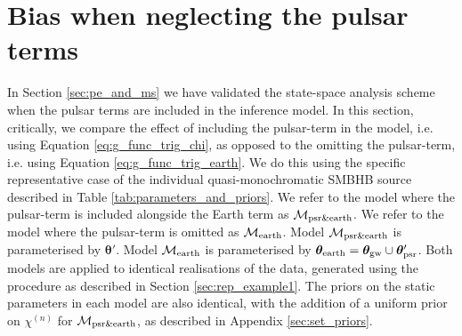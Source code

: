 \documentclass[fleqn,usenatbib,useAMS]{mnras}
\begin{document}
	
	







%







%

\section{Bias when neglecting the pulsar terms}\label{sec:earth_vs_psr}
In Section \ref{sec:pe_and_ms} we have validated the state-space analysis scheme when the pulsar terms are included in the inference model. In this section, critically, we compare the effect of including the pulsar-term in the model, i.e. using Equation \eqref{eq:g_func_trig_chi}, as opposed to the omitting the pulsar-term, i.e. using Equation \eqref{eq:g_func_trig_earth}. We do this using the specific representative case of the individual quasi-monochromatic SMBHB source described in Table \ref{tab:parameters_and_priors}. We refer to the model where the pulsar-term is included alongside the Earth term as $\mathcal{M}_{\rm psr \& earth}$. We refer to the model where the pulsar-term is omitted as 
$\mathcal{M}_{\rm earth}$. Model $\mathcal{M}_{\rm psr \& earth}$ is parameterised by $\boldsymbol{\theta}'$. Model $\mathcal{M}_{\rm earth}$ is parameterised by $\boldsymbol{\theta}_{\rm earth} = \boldsymbol{\theta}_{\rm gw} \cup \boldsymbol{\theta}'_{\rm psr}$. Both models are applied to identical realisations of the data, generated using the procedure as described in Section  \ref{sec:rep_example1}. The priors on the static parameters in each model are also identical, with the addition of a uniform prior on $\chi^{(n)}$ for $\mathcal{M}_{\rm psr \& earth}$, as described in Appendix \ref{sec:set_priors}. \newline 
\end{document}
